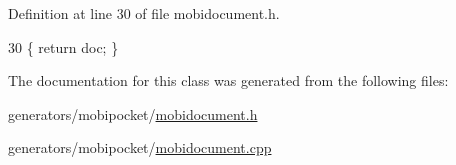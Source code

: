 Definition at line 30 of file mobidocument.\+h.


\begin{DoxyCode}
30 \{ \textcolor{keywordflow}{return} doc; \}
\end{DoxyCode}


The documentation for this class was generated from the following files\+:\begin{DoxyCompactItemize}
\item 
generators/mobipocket/\hyperlink{mobidocument_8h}{mobidocument.\+h}\item 
generators/mobipocket/\hyperlink{mobidocument_8cpp}{mobidocument.\+cpp}\end{DoxyCompactItemize}
